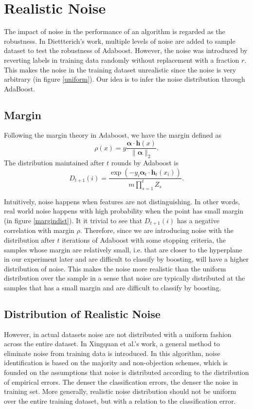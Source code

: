 \section{Realistic Noise}
The impact of noise in the performance of an algorithm is regarded as the robustness.
In Diettterich’s work\cite{dietterich2000experimental}, multiple levels of noise are added to sample dataset to test the robustness of Adaboost.
However, the noise was introduced by reverting labels in training data randomly without replacement with a fraction $r$.
This makes the noise in the training dataset unrealistic since the noise is very arbitrary (in figure \ref{uniform}).
Our idea is to infer the noise distribution through AdaBoost.



\subsection{Margin}
Following the margin theory in Adaboost, we have the margin defined as
\[\rho(x) = y \frac{ \mathbf{\alpha} \cdot \mathbf{h}(x) }{ \| \mathbf{\alpha}\|_2 }.\]
The distribution maintained after $t$ rounds by Adaboost is
\[D_{t+1}(i) = \frac{\exp( -y_i \mathbf{\alpha}_t \cdot \mathbf{h}_t (x_i) ) }{m \prod_{s=1}^t Z_s}.\]

Intuitively, noise happens when features are not distinguishing. In other words, real world noise happens with high probability when the point has small margin (in figure \ref{margindist}).
It it trivial to see that $D_{t+1}(i)$ has a negative correlation with margin $\rho$.
Therefore, since we are introducing noise with the distribution after $t$ iterations of Adaboost with some stopping criteria,
the samples whose margin are relatively small, i.e. that are closer to the hyperplane in our experiment later and
are difficult to classify by boosting, will have a higher distribution of noise.
This makes the noise more realistic than the uniform distribution over the sample in a sense that
noise are typically distributed at the samples that has a small margin and are difficult to classify by boosting.

\subsection{Distribution of Realistic Noise}
However, in actual datasets noise are not distributed with a uniform fashion across the entire dataset.
In Xingquan et al.’s work\cite{zhu2003eliminating}, a general method to eliminate noise from training data is introduced.
In this algorithm, noise identification is based on the majority and non-objection schemes,
which is founded on the assumptions that noise is distributed according to the distribution of empirical errors.
The denser the classification errors, the denser the noise in training set.
More generally, realistic noise distribution should not be uniform over the entire training dataset, but with a relation to the classification error.

